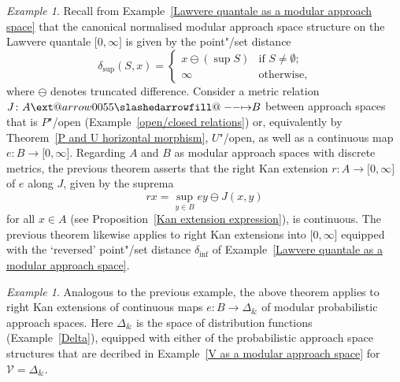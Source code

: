 \documentclass[preprint, a4paper]{elsarticle}
\makeatletter
\def\slashedarrowfill@#1#2#3#4#5{%
  $\m@th\thickmuskip0mu\medmuskip\thickmuskip\thinmuskip\thickmuskip
   \relax#5#1\mkern-7mu%
   \cleaders\hbox{$#5\mkern-2mu#2\mkern-2mu$}\hfill
   \mathclap{#3}\mathclap{#2}%
   \cleaders\hbox{$#5\mkern-2mu#2\mkern-2mu$}\hfill
   \mkern-7mu#4$%
}
\def\rightslashedarrowfill@{%
  \slashedarrowfill@\relbar\relbar\mapstochar\rightarrow}
\newcommand\xslashedrightarrow[2][]{%
  \ext@arrow 0055{\rightslashedarrowfill@}{#1}{#2}}
\def\slashedrightarrow{\xslashedrightarrow{}}
\theoremstyle{definition}
\theoremstyle{remark}
\newtheorem{example}[theorem]{Example}
\providecommand{\exref}[1]{Example~\ref{#1}}
\providecommand{\propref}[1]{Proposition~\ref{#1}}
\providecommand{\thmref}[1]{Theorem~\ref{#1}}
\providecommand{\brks}[1]{\lbrack #1 \rbrack}
\newcommand{\tn}{\mathbin\&}
\providecommand{\map}[3]{#1\colon#2\to#3}
\providecommand{\hmap}[3]{#1\colon#2\slashedrightarrow#3}
\providecommand{\catvar}[1]{\mathcal{#1}}
\providecommand{\2}{\mathsf 2}
\providecommand{\V}{\catvar V}
\makeatother
\begin{document}
	\begin{example}
		Recall from \exref{Lawvere quantale as a modular approach space} that the canonical normalised modular approach space structure on the Lawvere quantale $\brks{0, \infty}$ is given by the point"/set distance
		\begin{displaymath}
			\delta_{\sup}(S, x) = \begin{cases}
				x \ominus (\sup S) & \text{if $S \neq \emptyset$;} \\
				\infty & \text{otherwise,}
			\end{cases}
		\end{displaymath}
		where $\ominus$ denotes truncated difference. Consider a metric relation $\hmap JAB$ between approach spaces that is $P$"/open (\exref{open/closed relations}) or, equivalently by \thmref{P and U horizontal morphism}, $U$"/open, as well as a continuous map \mbox{$\map eB{\brks{0, \infty}}$}. Regarding $A$ and $B$ as modular approach spaces with discrete metrics, the previous theorem asserts that the right Kan extension $\map rA{\brks{0, \infty}}$ of $e$ along $J$, given by the suprema
		\begin{displaymath}
			rx = \sup_{y \in B} ey \ominus J(x, y)
		\end{displaymath}
		for all $x \in A$ (see \propref{Kan extension expression}), is continuous. The previous theorem likewise applies to right Kan extensions into $\brks{0, \infty}$ equipped with the `reversed' point"/set distance $\delta_{\inf}$ of \exref{Lawvere quantale as a modular approach space}.
	\end{example}	
	\begin{example}
		Analogous to the previous example, the above theorem applies to right Kan extensions of continuous maps $\map eB{\Delta_{\tn}}$ of modular probabilistic approach spaces. Here $\Delta_{\tn}$ is the space of distribution functions (\exref{Delta}), equipped with either of the probabilistic approach space structures that are decribed in \exref{V as a modular approach space} for $\V = \Delta_{\tn}$.
	\end{example}
	
\end{document}
